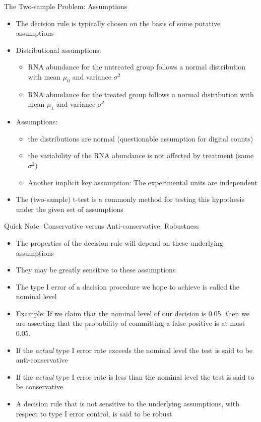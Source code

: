 \documentclass[xcolor=x11names,compress]{beamer}\usepackage[]{graphicx}\usepackage[]{color}
\begin{document}
\begin{frame}{The Two-sample Problem: Assumptions}
  \begin{itemize}
  \item The decision rule is typically chosen on the basis of some putative assumptions
  \item Distributional assumptions:
    \begin{itemize}
    \item RNA abundance for the untreated group follows a normal distribution with mean $\mu_0$ and
        variance $\sigma^2$
     \item RNA abundance for the treated group follows a normal distribution with mean $\mu_1$ and
        variance $\sigma^2$
    \end{itemize}
  \item Assumptions:
    \begin{itemize}
    \item the distributions are normal (questionable assumption for digital counts)
    \item the variability of the RNA abundance is not affected by treatment (same $\sigma^2$)
    \item Another implicit key assumption: The experimental units are independent
    \end{itemize}
  \item The (two-sample) t-test is a commonly method for testing this hypothesis under the given set of assumptions
  
  \end{itemize}
  
\end{frame}


\begin{frame}{Quick Note: Conservative versus Anti-conservative; Robustness}
  \begin{itemize}
  \item The properties of the decision rule will depend on these 
         underlying assumptions
  \item They  may be greatly sensitive to these assumptions
  \item The type I error of a decision procedure we hope to achieve is
        called the nominal level
  \item Example: If we claim that the nominal level of our decision is 0.05, then we are asserting that the probability of committing a false-positive is at most 0.05.
  \item If the {\it actual} type I error rate exceeds
        the nominal level the test is said to be anti-conservative
  \item If the {\it actual} type I error rate is less than
        the nominal level the test is said to be  conservative
   \item A decision rule that is not sensitive to the underlying 
     assumptions, with respect to type I error control, is said to be robust
  \end{itemize}
\end{frame}
\end{document}
